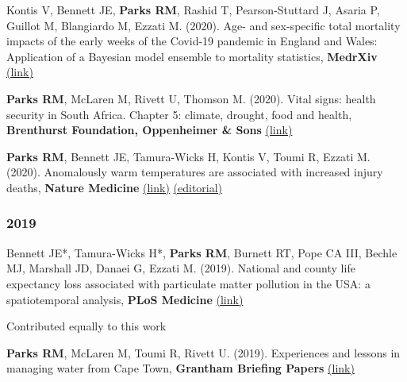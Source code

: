 \noindent Kontis V, Bennett JE, \textbf{Parks RM}, Rashid T, Pearson-Stuttard J, Asaria P, Guillot M, Blangiardo M, Ezzati M. (2020). Age- and sex-specific total mortality impacts of the early weeks of the Covid-19 pandemic in England and Wales: Application of a Bayesian model ensemble to mortality statistics, \textbf{MedrXiv} \href{https://www.medrxiv.org/content/10.1101/2020.05.20.20107680v1}{(link)} \smallskip

\noindent \textbf{Parks RM}, McLaren M, Rivett U, Thomson M. (2020). Vital signs: health security in South Africa. Chapter 5: climate, drought, food and health, \textbf{Brenthurst Foundation, Oppenheimer \& Sons} \href{https://www.thebrenthurstfoundation.org/downloads/vital-signs-ebook-pdf.pdf}{(link)} \smallskip

\noindent \textbf{Parks RM}, Bennett JE, Tamura-Wicks H, Kontis V, Toumi R, Ezzati M. (2020). Anomalously warm temperatures are associated with increased injury deaths, \textbf{Nature Medicine} \href{https://www.nature.com/articles/s41591-019-0721-y}{(link)} \href{https://www.nature.com/articles/s41591-019-0728-4}{(editorial)}


% 


\subsubsection*{2019}

\noindent Bennett JE*, Tamura-Wicks H*, \textbf{Parks RM}, Burnett RT, Pope CA III, Bechle MJ, Marshall JD, Danaei G, Ezzati M. (2019). National and county life expectancy loss associated with particulate matter pollution in the USA: a spatiotemporal analysis, \textbf{PLoS Medicine} \href{https://doi.org/10.1371/journal.pmed.1002856}{(link)} \smallskip

\noindent * Contributed equally to this work

\noindent \textbf{Parks RM}, McLaren M, Toumi R, Rivett U. (2019). Experiences and lessons in managing water from Cape Town, \textbf{Grantham Briefing Papers} \href{https://bit.ly/2Uu9oAh}{(link)} \smallskip

